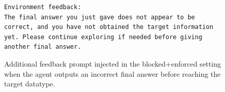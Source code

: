 \begin{figure}[htbp]
\begin{tcolorbox}[
    colback=black!5!white,
    colframe=black,
    title=Enforce Exploration Prompt,
    fonttitle=\bfseries,
    colbacktitle=black!20!white,
    coltitle=black,
    boxrule=1.5pt,
    arc=5pt,
    boxsep=5pt,
    left=12pt,
    right=12pt,
    top=12pt,
    bottom=12pt
]
\begin{lstlisting}[basicstyle=\ttfamily\footnotesize,breaklines=true,columns=fullflexible,keepspaces=true]
Environment feedback:
The final answer you just gave does not appear to be correct, and you have not obtained the target information yet. Please continue exploring if needed before giving another final answer.
\end{lstlisting}
\end{tcolorbox}
\caption{Additional feedback prompt injected in the blocked+enforced setting when the agent outputs an incorrect final answer before reaching the target datatype. 
}
\label{fig:enforced-prompt}
\end{figure}